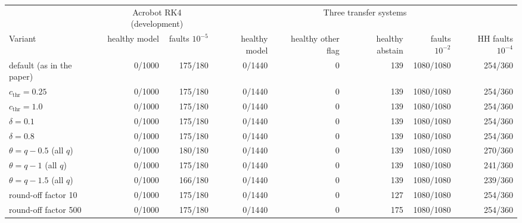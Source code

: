 \begin{tabular}{lrrrrrrr}
\toprule
 & \multicolumn{2}{c}{Acrobot RK4 (development)} & \multicolumn{5}{c}{Three transfer systems} \\
\cmidrule(lr){2-3}\cmidrule(lr){4-8}
Variant & healthy model & faults $10^{-5}$ & healthy model & healthy other flag & healthy abstain & faults $10^{-2}$ & HH faults $10^{-4}$ \\
\midrule
default (as in the paper) & 0/1000 & 175/180 & 0/1440 & 0 & 139 & 1080/1080 & 254/360 \\
$c_{\mathrm{thr}}=0.25$ & 0/1000 & 175/180 & 0/1440 & 0 & 139 & 1080/1080 & 254/360 \\
$c_{\mathrm{thr}}=1.0$ & 0/1000 & 175/180 & 0/1440 & 0 & 139 & 1080/1080 & 254/360 \\
$\delta=0.1$ & 0/1000 & 175/180 & 0/1440 & 0 & 139 & 1080/1080 & 254/360 \\
$\delta=0.8$ & 0/1000 & 175/180 & 0/1440 & 0 & 139 & 1080/1080 & 254/360 \\
$\theta=q-0.5$ (all $q$) & 0/1000 & 180/180 & 0/1440 & 0 & 139 & 1080/1080 & 270/360 \\
$\theta=q-1$ (all $q$) & 0/1000 & 175/180 & 0/1440 & 0 & 139 & 1080/1080 & 241/360 \\
$\theta=q-1.5$ (all $q$) & 0/1000 & 166/180 & 0/1440 & 0 & 139 & 1080/1080 & 239/360 \\
round-off factor 10 & 0/1000 & 175/180 & 0/1440 & 0 & 127 & 1080/1080 & 254/360 \\
round-off factor 500 & 0/1000 & 175/180 & 0/1440 & 0 & 175 & 1080/1080 & 254/360 \\
\bottomrule
\end{tabular}
